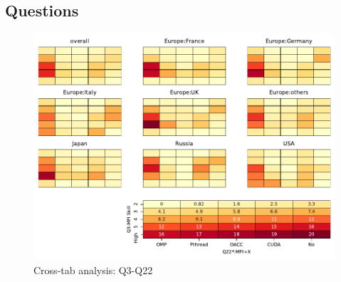 
\subsection{Questions}


\begin{figure}
\begin{center}
\includegraphics[width=12cm]{../pdfs/Q3-Q22.pdf}
\caption{Cross-tab analysis: Q3-Q22}
\label{fig:Q3-Q22}
\end{center}
\end{figure}
